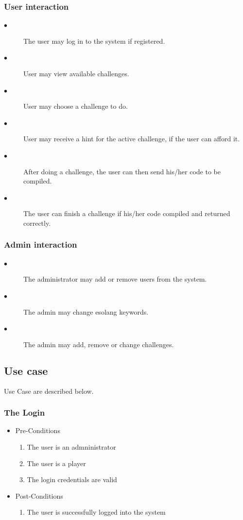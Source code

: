 \documentclass[english]{article}
\begin{document}
		\subsubsection{User interaction}
		\begin{description}
			\item[$\bullet$] The user may log in to the system if registered.
			\item[$\bullet$] User may view available challenges.
			\item[$\bullet$] User may choose a challenge to do.
			\item[$\bullet$] User may receive a hint for the active challenge, if the user can afford it.
			\item[$\bullet$] After doing a challenge, the user can then send his/her code to be compiled.
			\item[$\bullet$] The user can finish a challenge if his/her code compiled and returned correctly.
		\end{description}
		
		\subsubsection{Admin interaction}
		\begin{description}
			\item[$\bullet$] The administrator may add or remove users from the system.
			\item[$\bullet$] The admin may change esolang keywords.
			\item[$\bullet$] The admin may add, remove or change challenges.
		\end{description}

		
		\subsection{Use case}
		Use Case are described below.
		
		
		
		\subsubsection{The Login}
		\begin{itemize}
	
		
		\item Pre-Conditions
			\begin{enumerate}
				\item The user is an admninistrator
				\item The user is a player
				\item The login credentials are valid
			\end{enumerate}
		\item Post-Conditions
			\begin{enumerate}
			\item The user is successfully logged into the system
						
			\end{enumerate}
		
			
		

\end{itemize}
\end{document}
